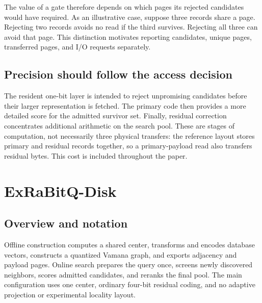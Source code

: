 The value of a gate therefore depends on which pages its rejected candidates would have required. As an illustrative case, suppose three records share a page. Rejecting two records avoids no read if the third survives. Rejecting all three can avoid that page. This distinction motivates reporting candidates, unique pages, transferred pages, and I/O requests separately.

\subsection{Precision should follow the access decision}

The resident one-bit layer is intended to reject unpromising candidates before their larger representation is fetched. The primary code then provides a more detailed score for the admitted survivor set. Finally, residual correction concentrates additional arithmetic on the search pool. These are stages of computation, not necessarily three physical transfers: the reference layout stores primary and residual records together, so a primary-payload read also transfers residual bytes. This cost is included throughout the paper.

\section{ExRaBitQ-Disk}


\subsection{Overview and notation}

Offline construction computes a shared center, transforms and encodes database vectors, constructs a quantized Vamana graph, and exports adjacency and payload pages. Online search prepares the query once, screens newly discovered neighbors, scores admitted candidates, and reranks the final pool. The main configuration uses one center, ordinary four-bit residual coding, and no adaptive projection or experimental locality layout.

